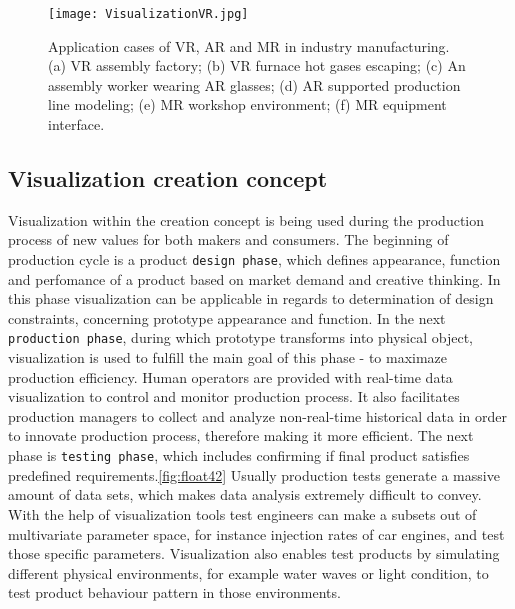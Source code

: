 \documentclass[thesis=B,english]{FITthesis}[2019/12/23]
\begin{document}
\begin{figure}
	\texttt{[image: VisualizationVR.jpg]}
	\caption[Application cases of VR, AR and MR in industry manufacturing. (a) VR assembly factory; (b) VR furnace hot gases escaping; (c) An assembly worker wearing AR glasses; (d) AR supported production line modeling; (e) MR workshop environment; (f) MR equipment interface.]{Application cases of VR, AR and MR in industry manufacturing. (a) VR assembly factory; (b) VR furnace hot gases escaping; (c) An assembly worker wearing AR glasses; (d) AR supported production line modeling; (e) MR workshop environment; (f) MR equipment interface.}\label{fig:float41}
\end{figure} 

\subsection{Visualization creation concept}

Visualization within the creation concept is being used during the production process of new values for both makers and consumers. The beginning of production cycle is a product \verb|design phase|, which defines appearance, function and perfomance of a product based on market demand and creative thinking. In this phase visualization can be applicable in regards to determination of design constraints, concerning prototype appearance and function. In the next \verb|production phase|, during which prototype transforms into physical object, visualization is used to fulfill the main goal of this phase - to maximaze production efficiency. Human operators are provided with real-time data visualization to control and monitor production process. It also facilitates production managers to collect and analyze non-real-time historical data in order to innovate production process, therefore making it more efficient. The next phase is \verb|testing phase|, which includes confirming if final product satisfies predefined requirements.\ref{fig:float42} Usually production tests generate a massive amount of data sets, which makes data analysis extremely difficult to convey. With the help of visualization tools test engineers can make a subsets out of multivariate parameter space, for instance injection rates of car engines, and test those specific parameters. Visualization also enables test products by simulating different physical environments, for example water waves or light condition, to test product behaviour pattern in those environments.\cite{bib_6}
\end{document}
